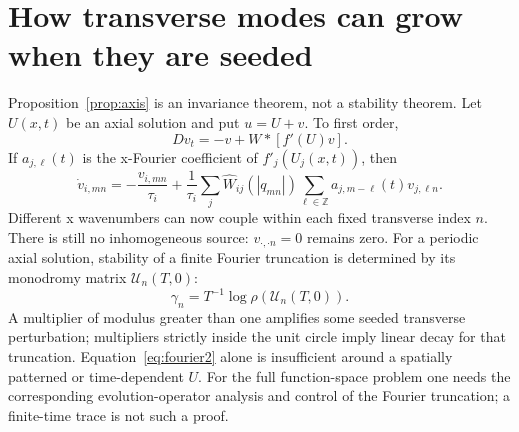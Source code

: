 \documentclass[11pt]{article}
\begin{document}
\section{How transverse modes can grow when they are seeded}
Proposition~\ref{prop:axis} is an invariance theorem, not a stability theorem.
Let $U(x,t)$ be an axial solution and put $u=U+v$. To first order,
\begin{equation}
 Dv_t=-v+W*[f'(U)v].
 \label{eq:transverse}
\end{equation}
If $a_{j,\ell}(t)$ is the x-Fourier coefficient of $f'_j(U_j(x,t))$, then
\begin{equation}
 \dot v_{i,mn}=-\frac{v_{i,mn}}{\tau_i}
 +\frac1{\tau_i}\sum_j\widehat W_{ij}(|q_{mn}|)
       \sum_{\ell\in\mathbb Z}a_{j,m-\ell}(t)v_{j,\ell n}.
 \label{eq:transversefourier}
\end{equation}
Different x wavenumbers can now couple within each fixed transverse index $n$.
There is still no inhomogeneous source: $v_{\cdot,\cdot n}=0$ remains zero.
For a periodic axial solution, stability of a finite Fourier truncation is
determined by its monodromy matrix $\mathcal U_n(T,0)$:
\begin{equation}
 \gamma_n=T^{-1}\log\rho(\mathcal U_n(T,0)).
 \label{eq:floquet}
\end{equation}
A multiplier of modulus greater than one amplifies some seeded transverse
perturbation; multipliers strictly inside the unit circle imply linear decay
for that truncation. Equation~\eqref{eq:fourier2} alone is insufficient around
a spatially patterned or time-dependent $U$. For the full function-space
problem one needs the corresponding evolution-operator analysis and control
of the Fourier truncation; a finite-time trace is not such a proof.
\end{document}
